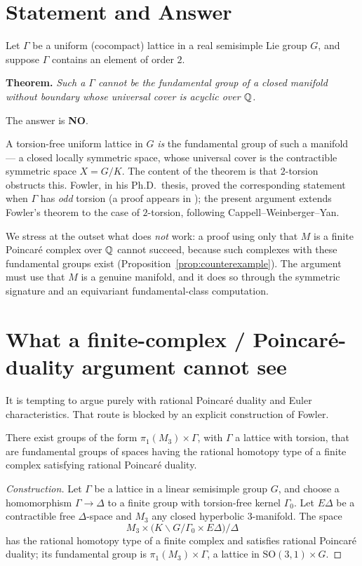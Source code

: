 \documentclass[11pt]{article}
\begin{document}
\section*{Statement and Answer}

Let $\Gamma$ be a uniform (cocompact) lattice in a real semisimple Lie group
$G$, and suppose $\Gamma$ contains an element of order $2$.

\medskip
\noindent\textbf{Theorem.} \emph{Such a $\Gamma$ cannot be the fundamental group
of a closed manifold without boundary whose universal cover is acyclic over
$\mathbb{Q}$.}

\medskip
\noindent The answer is \textbf{NO}.

\medskip
A torsion-free uniform lattice in $G$ \emph{is} the fundamental group of such a
manifold --- a closed locally symmetric space, whose universal cover is the
contractible symmetric space $X=G/K$. The content of the theorem is that
$2$-torsion obstructs this. Fowler, in his Ph.D.\ thesis, proved the
corresponding statement when $\Gamma$ has \emph{odd} torsion (a proof appears in
\cite{W2}); the present argument extends Fowler's theorem to the case of
$2$-torsion, following Cappell--Weinberger--Yan.

We stress at the outset what does \emph{not} work: a proof using only that $M$
is a finite Poincar\'e complex over $\mathbb{Q}$ cannot succeed, because such complexes
with these fundamental groups exist (Proposition~\ref{prop:counterexample}). The
argument must use that $M$ is a genuine manifold, and it does so through the
symmetric signature and an equivariant fundamental-class computation.

\section*{What a finite-complex / Poincar\'e-duality argument cannot see}

It is tempting to argue purely with rational Poincar\'e duality and Euler
characteristics. That route is blocked by an explicit construction of Fowler.

\begin{qsevenproposition}\label{prop:counterexample}
There exist groups of the form $\pi_1(M_3)\times\Gamma$, with $\Gamma$ a lattice
with torsion, that are fundamental groups of spaces having the rational homotopy
type of a finite complex satisfying rational Poincar\'e duality.
\end{qsevenproposition}

\begin{proof}[Construction]
Let $\Gamma$ be a lattice in a linear semisimple group $G$, and choose a
homomorphism $\Gamma\to\Delta$ to a finite group with torsion-free kernel
$\Gamma_0$. Let $E\Delta$ be a contractible free $\Delta$-space and $M_3$ any
closed hyperbolic $3$-manifold. The space
\[
  M_3\times\bigl(K\backslash G/\Gamma_0\times E\Delta\bigr)/\Delta
\]
has the rational homotopy type of a finite complex and satisfies rational
Poincar\'e duality; its fundamental group is $\pi_1(M_3)\times\Gamma$, a lattice
in $\mathrm{SO}(3,1)\times G$.
\end{proof}
\end{document}
